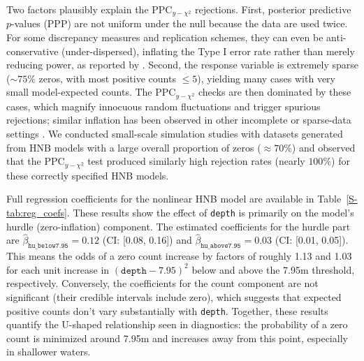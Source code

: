Two factors plausibly explain the $\text{PPC}_{y-\chi^2}$ rejections. First, posterior predictive $p$-values (PPP) are not uniform under the null because the data are used twice. For some discrepancy measures and replication schemes, they can even be anti-conservative (under-dispersed), inflating the Type I error rate rather than merely reducing power, as reported by \citep[e.g.,][]{BerkhofJohannes2000PpcP,RubinDelanchyPatrick2014Pppa}. Second, the response variable is extremely sparse ($\sim\!75\%$ zeros, with most positive counts $\leq 5$), yielding many cases with very small model-expected counts. The $\text{PPC}_{y-\chi^2}$ checks are then dominated by these cases, which magnify innocuous random fluctuations and trigger spurious rejections; similar inflation has been observed in other incomplete or sparse-data settings \citep[e.g.,][]{XuDandan2016Anop}. We conducted small-scale simulation studies with datasets generated from HNB models with a large overall proportion of zeros ($\approx 70\%$) and observed that the $\text{PPC}_{y-\chi^2}$ test produced similarly high rejection rates (nearly $100\%$) for these correctly specified HNB models. 



Full regression coefficients for the nonlinear HNB model are available in Table~\ref{S-tab:reg_coefs}. These results show the effect of \texttt{depth} is primarily on the model's hurdle (zero-inflation) component. The estimated coefficients for the hurdle part are $\hat\beta_{\texttt{hu\_below7.95}} = 0.12$ (CI: [0.08, 0.16]) and $\hat\beta_{\texttt{hu\_above7.95}} = 0.03$ (CI: [0.01, 0.05]). This means the odds of a zero count increase by factors of roughly 1.13 and 1.03 for each unit increase in $(\texttt{depth}-7.95)^2$ below and above the 7.95m threshold, respectively. Conversely, the coefficients for the count component are not significant (their credible intervals include zero), which suggests that expected positive counts don't vary substantially with 	\texttt{depth}. Together, these results quantify the U-shaped relationship seen in diagnostics: the probability of a zero count is minimized around 7.95m and increases away from this point, especially in shallower waters.


